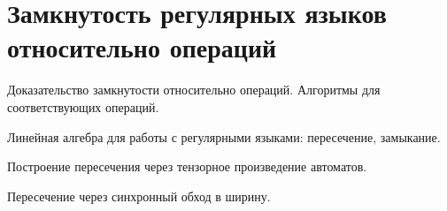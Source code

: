 \section{Замкнутость регулярных языков относительно операций}

Доказательство замкнутости относительно операций. Алгоритмы для соответствующих операций.

Линейная алгебра для работы с регулярными языками: пересечение, замыкание.

Построение пересечения через тензорное произведение автоматов.

Пересечение через синхронный обход в ширину.

%
%
